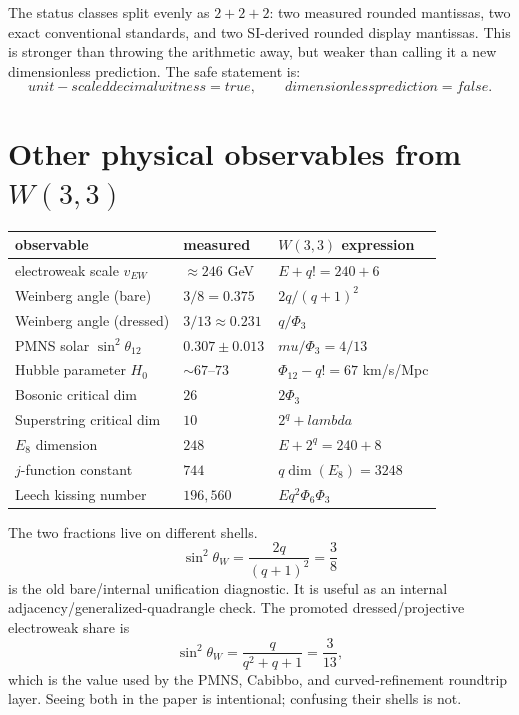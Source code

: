 \documentclass[11pt]{article}
\def\mathrm#1{#1}%
\def\text#1{#1}%
\def\lambda{lambda}%
\def\mu{mu}%
\def\Phi#1{Phi#1}%
\def\cdot{ }%
\begin{document}
The status classes split evenly as $2+2+2$: two measured rounded mantissas,
two exact conventional standards, and two SI-derived rounded display
mantissas.  This is stronger than throwing the arithmetic away, but weaker
than calling it a new dimensionless prediction.  The safe statement is:
\[
\text{unit-scaled decimal witness}=\mathrm{true},\qquad
\text{dimensionless prediction}=\mathrm{false}.
\]

\section{\texorpdfstring{Other physical observables from $W(3,3)$}{Other physical observables from W(3,3)}}

\begin{center}
\renewcommand{\arraystretch}{1.3}
\begin{tabular}{l l l}
\toprule
observable & measured & $W(3,3)$ expression \\
\midrule
electroweak scale $v_{EW}$ & $\approx 246$ GeV & $E + q! = 240 + 6$ \\
Weinberg angle (bare) & $3/8 = 0.375$ & $2q / (q+1)^2$ \\
Weinberg angle (dressed) & $3/13 \approx 0.231$ & $q / \Phi_3$ \\
PMNS solar $\sin^2 \theta_{12}$ & $0.307 \pm 0.013$ & $\mu / \Phi_3 = 4/13$ \\
Hubble parameter $H_0$ & $\sim 67$--$73$ & $\Phi_{12} - q! = 67$ km/s/Mpc \\
Bosonic critical dim & $26$ & $2\Phi_3$ \\
Superstring critical dim & $10$ & $2^q + \lambda$ \\
$E_8$ dimension & $248$ & $E + 2^q = 240 + 8$ \\
$j$-function constant & $744$ & $q \cdot \dim(E_8) = 3 \cdot 248$ \\
Leech kissing number & $196{,}560$ & $E \cdot q^2 \cdot \Phi_6 \cdot \Phi_3$ \\
\bottomrule
\end{tabular}
\end{center}

\begin{statusbox}[title=Why two Weinberg-angle fractions?]
The two fractions live on different shells.
\[
\sin^2\theta_W = \frac{2q}{(q+1)^2}=\frac{3}{8}
\]
is the old bare/internal unification diagnostic. It is useful as an internal adjacency/generalized-quadrangle check. The promoted dressed/projective electroweak share is
\[
\sin^2\theta_W = \frac{q}{q^2+q+1}=\frac{3}{13},
\]
which is the value used by the PMNS, Cabibbo, and curved-refinement roundtrip layer. Seeing both in the paper is intentional; confusing their shells is not.
\end{statusbox}
\end{document}
